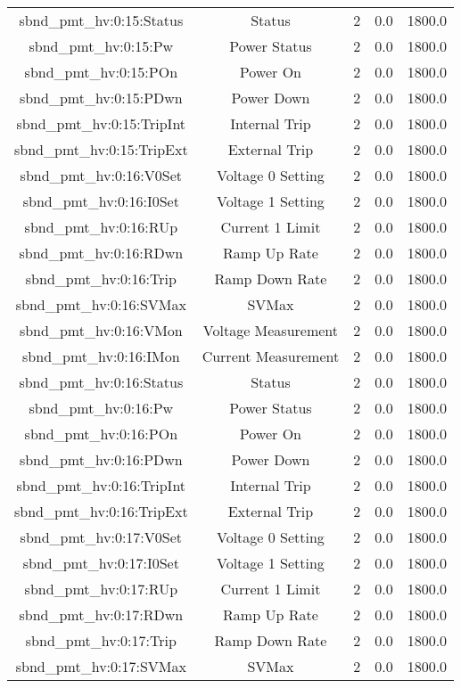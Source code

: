 \begin{center}
\begin{longtable}{c | c c c c }
sbnd\_pmt\_hv:0:15:Status & Status & 2 & 0.0 & 1800.0\\ 
sbnd\_pmt\_hv:0:15:Pw & Power Status & 2 & 0.0 & 1800.0\\ 
sbnd\_pmt\_hv:0:15:POn & Power On & 2 & 0.0 & 1800.0\\ 
sbnd\_pmt\_hv:0:15:PDwn & Power Down & 2 & 0.0 & 1800.0\\ 
sbnd\_pmt\_hv:0:15:TripInt & Internal Trip & 2 & 0.0 & 1800.0\\ 
sbnd\_pmt\_hv:0:15:TripExt & External Trip & 2 & 0.0 & 1800.0\\ 
sbnd\_pmt\_hv:0:16:V0Set & Voltage 0 Setting & 2 & 0.0 & 1800.0\\ 
sbnd\_pmt\_hv:0:16:I0Set & Voltage 1 Setting & 2 & 0.0 & 1800.0\\ 
sbnd\_pmt\_hv:0:16:RUp & Current 1 Limit & 2 & 0.0 & 1800.0\\ 
sbnd\_pmt\_hv:0:16:RDwn & Ramp Up Rate & 2 & 0.0 & 1800.0\\ 
sbnd\_pmt\_hv:0:16:Trip & Ramp Down Rate & 2 & 0.0 & 1800.0\\ 
sbnd\_pmt\_hv:0:16:SVMax & SVMax & 2 & 0.0 & 1800.0\\ 
sbnd\_pmt\_hv:0:16:VMon & Voltage Measurement & 2 & 0.0 & 1800.0\\ 
sbnd\_pmt\_hv:0:16:IMon & Current Measurement & 2 & 0.0 & 1800.0\\ 
sbnd\_pmt\_hv:0:16:Status & Status & 2 & 0.0 & 1800.0\\ 
sbnd\_pmt\_hv:0:16:Pw & Power Status & 2 & 0.0 & 1800.0\\ 
sbnd\_pmt\_hv:0:16:POn & Power On & 2 & 0.0 & 1800.0\\ 
sbnd\_pmt\_hv:0:16:PDwn & Power Down & 2 & 0.0 & 1800.0\\ 
sbnd\_pmt\_hv:0:16:TripInt & Internal Trip & 2 & 0.0 & 1800.0\\ 
sbnd\_pmt\_hv:0:16:TripExt & External Trip & 2 & 0.0 & 1800.0\\ 
sbnd\_pmt\_hv:0:17:V0Set & Voltage 0 Setting & 2 & 0.0 & 1800.0\\ 
sbnd\_pmt\_hv:0:17:I0Set & Voltage 1 Setting & 2 & 0.0 & 1800.0\\ 
sbnd\_pmt\_hv:0:17:RUp & Current 1 Limit & 2 & 0.0 & 1800.0\\ 
sbnd\_pmt\_hv:0:17:RDwn & Ramp Up Rate & 2 & 0.0 & 1800.0\\ 
sbnd\_pmt\_hv:0:17:Trip & Ramp Down Rate & 2 & 0.0 & 1800.0\\ 
sbnd\_pmt\_hv:0:17:SVMax & SVMax & 2 & 0.0 & 1800.0\\ 

\end{longtable}
\end{center}
